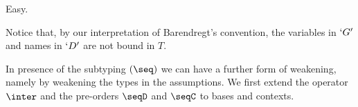 \documentclass{CSML}
\newcommand{\Comment}[1]{}
\begin{document}
 \begin{Proof} Easy. 
 \end{Proof}

Notice that, by our interpretation of Barendregt's convention, the variables in $`G'$ and names in $`D'$ are not bound in $T$.

\Comment{%
 \begin{rem}
Notice that weakening is only sound when extending Barendregt's convention to judgements.
If we would not do so, then, for example, we could derive
%
 \[ \begin{array}{c}
\Inf	[\Weak]
	{\Inf	[\LAbs]
{\Inf	[\Ax]
	{ \derLmu x{:}`k\arrow `r |- x : `k\arrow `r | {} }
}{ \derLmu {} |- `lx.x : (`k\arrow `r)\prod `k\arrow `r | {} }
	}{ \derLmu x{:}`d |- `lx.x : (`k\arrow `r)\prod `k\arrow `r | {} }
 \end{array} \]

Note that we cannot apply rule $(\LAbs)$ to this derivation, since that would create the term $`lx.`lx.x$, which is not a valid term.
We can solve this through $`a$-conversion, replacing $`lx.x$ by $`ly.y$; 
%
 \[ \begin{array}{c}
\Inf	[\Weak]
	{\Inf	[\LAbs]
{\Inf	[\Ax]
	{ \derLmu y{:}`k\arrow `r |- y : `k\arrow `r | {} }
}{ \derLmu {} |- `ly.y : (`k\arrow `r)\prod `k\arrow `r | {} }
	}{ \derLmu x{:}`d |- `ly.y : (`k\arrow `r)\prod `k\arrow `r | {} }
 \end{array} \]
notice that then the application of rule $(\Weak)$ is valid according to our criteria.
 \end{rem}
}%

In presence of the subtyping $(\seq)$ we can have a further form of weakening, namely by weakening the types in the assumptions. 
We first extend the operator $\inter$ and the pre-orders $\seqD$ and $\seqC$ to bases and contexts.
\end{document}

